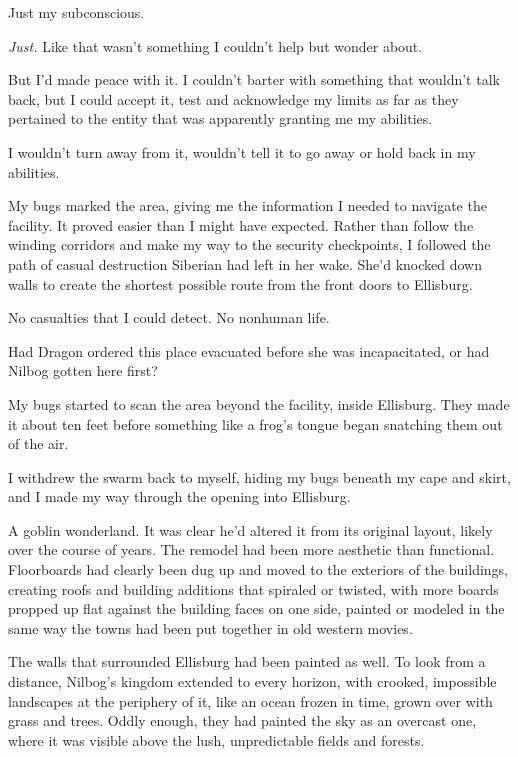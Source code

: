 Just my subconscious.



\emph{Just.  }Like that wasn't something I couldn't help but wonder about.



But I'd made peace with it.  I couldn't barter with something that wouldn't talk back, but I could accept it, test and acknowledge my limits as far as they pertained to the entity that was apparently granting me my abilities.



I wouldn't turn away from it, wouldn't tell it to go away or hold back in my abilities.



My bugs marked the area, giving me the information I needed to navigate the facility.  It proved easier than I might have expected.  Rather than follow the winding corridors and make my way to the security checkpoints, I followed the path of casual destruction Siberian had left in her wake.  She'd knocked down walls to create the shortest possible route from the front doors to Ellisburg.



No casualties that I could detect.  No nonhuman life.



Had Dragon ordered this place evacuated before she was incapacitated, or had Nilbog gotten here first?



My bugs started to scan the area beyond the facility, inside Ellisburg.  They made it about ten feet before something like a frog's tongue began snatching them out of the air.



I withdrew the swarm back to myself, hiding my bugs beneath my cape and skirt, and I made my way through the opening into Ellisburg.



A goblin wonderland.  It was clear he'd altered it from its original layout, likely over the course of years.  The remodel had been more aesthetic than functional.  Floorboards had clearly been dug up and moved to the exteriors of the buildings, creating roofs and building additions that spiraled or twisted, with more boards propped up flat against the building faces on one side, painted or modeled in the same way the towns had been put together in old western movies.



The walls that surrounded Ellisburg had been painted as well.  To look from a distance, Nilbog's kingdom extended to every horizon, with crooked, impossible landscapes at the periphery of it, like an ocean frozen in time, grown over with grass and trees.  Oddly enough, they had painted the sky as an overcast one, where it was visible above the lush, unpredictable fields and forests.



